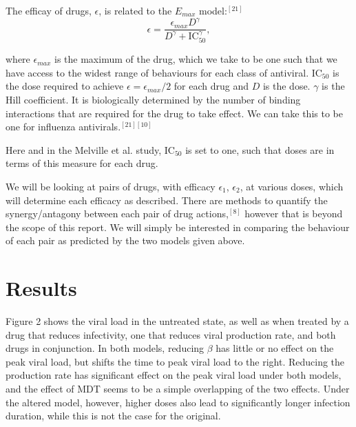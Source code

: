 \documentclass[a4paper,11pt]{article}
\begin{document}
The efficay of drugs, $\epsilon$, is related to the $E_{max}$ model:$^{[21]}$ $$\epsilon = \frac{\epsilon_{max}D^\gamma}{D^\gamma+\mathrm{IC}_{50}^\gamma},$$

where $\epsilon_{max}$ is the maximum of the drug, which we take to be one such that we have access to the widest range of behaviours for each class of antiviral. $\mathrm{IC}_{50}$ is the dose required to achieve $\epsilon = \epsilon_{max}/2$ for each drug and $D$ is the dose. $\gamma$ is the Hill coefficient. It is biologically determined by the number of binding interactions that are required for the drug to take effect. We can take this to be one for influenza antivirals.$^{[21][10]}$

Here and in the Melville et al. study, $\mathrm{IC}_{50}$ is set to one, such that doses are in terms of this measure for each drug. 


We will be looking at pairs of drugs, with efficacy $\epsilon_1$, $\epsilon_2$, at various doses, which will determine each efficacy as described. There are methods to quantify the synergy/antagony between each pair of drug actions,$^{[8]}$ however that is beyond the scope of this report. We will simply be interested in comparing the behaviour of each pair as predicted by the two models given above. 

\section*{Results}
Figure 2 shows the viral load in the untreated state, as well as when treated by a drug that reduces infectivity, one that reduces viral production rate, and both drugs in conjunction. In both models, reducing $\beta$ has little or no effect on the peak viral load, but shifts the time to peak viral load to the right. Reducing the production rate has significant effect on the peak viral load under both models, and the effect of MDT seems to be a simple overlapping of the two effects. Under the altered model, however, higher doses also lead to significantly longer infection duration, while this is not the case for the original. 
\end{document}
